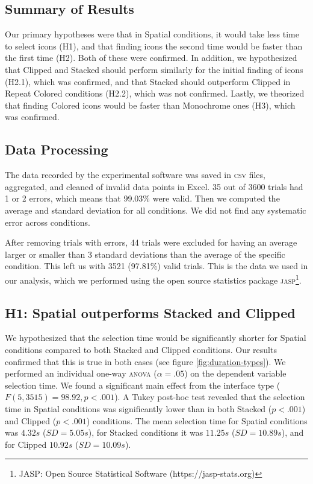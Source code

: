 \documentclass[nobib]{tufte-book} %
\begin{document}
\subsection{Summary of Results}
Our primary hypotheses were that in Spatial conditions, it would take less time to select icons (H1), and that finding icons the second time would be faster than the first time (H2). Both of these were confirmed. In addition, we hypothesized that Clipped and Stacked should perform similarly for the initial finding of icons (H2.1), which was confirmed, and that Stacked should outperform Clipped in Repeat Colored conditions (H2.2), which was not confirmed.
Lastly, we theorized that finding Colored icons would be faster than Monochrome ones (H3), which was confirmed.

\subsection{Data Processing}
The data recorded by the experimental software was saved in \textsc{csv} files, aggregated, and cleaned of invalid data points in Excel. 35 out of 3600 trials had 1 or 2 errors, which means that 99.03\% were valid. Then we computed the average and standard deviation for all conditions. We did not find any systematic error across conditions.

After removing trials with errors, 44 trials were excluded for having an average larger or smaller than 3 standard deviations than the average of the specific condition. This left us with 3521 (97.81\%) valid trials. This is the data we used in our analysis, which we performed using the open source statistics package \textsc{jasp}\footnote{JASP: Open Source Statistical Software (https://jasp-stats.org)}.

\subsection{H1: Spatial outperforms Stacked and Clipped}
We hypothesized that the selection time would be significantly shorter for Spatial conditions compared to both Stacked and Clipped conditions. Our results confirmed that this is true in both cases (see figure \ref{fig:duration-types}). We performed an individual one-way \textsc{anova} ($\alpha = .05$) on the dependent variable selection time. We found a significant main effect from the interface type ($F(5,3515) = 98.92, p < .001$).
A Tukey post-hoc test revealed that the selection time in Spatial conditions was significantly lower than in both Stacked ($p < .001$) and Clipped ($p < .001$) conditions. The mean selection time for Spatial conditions was $4.32 s$ ($SD = 5.05 s$), for Stacked conditions it was $11.25 s$ ($SD = 10.89 s$), and for Clipped $10.92 s$ ($SD = 10.09 s$).
\end{document}
